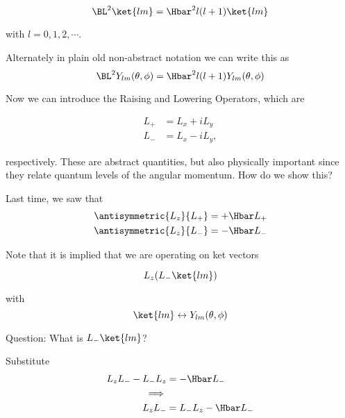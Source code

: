 \begin{equation}\label{eqn:PHY356Foct19:1008}
\BL^2 \ket{lm} = \Hbar^2 l (l + 1)\ket{l m}
\end{equation}

with \(l = 0, 1, 2, \cdots\).

Alternately in plain old non-abstract notation we can write this as
\begin{equation}\label{eqn:PHY356Foct19:1009}
\BL^2 Y_{lm}(\theta, \phi) = \Hbar^2 l (l + 1) Y_{lm}(\theta, \phi)
\end{equation}

Now we can introduce the Raising and Lowering Operators, which are

\begin{equation}\label{eqn:PHY356Foct19:1010}
\begin{aligned}
L_{+} &= L_x + i L_y \\
L_{-} &= L_x - i L_y,
\end{aligned}
\end{equation}

respectively.  These are abstract quantities, but also physically important since they relate quantum levels of the angular momentum.  How do we show this?

Last time, we saw that
\begin{equation}\label{eqn:PHY356Foct19:1011}
\begin{aligned}
\antisymmetric{L_z}{L_{+}} &= +\Hbar L_{+} \\
\antisymmetric{L_z}{L_{-}} &= -\Hbar L_{-}
\end{aligned}
\end{equation}

Note that it is implied that we are operating on ket vectors

\begin{equation}\label{eqn:lecture6OrbitalandIntrinsicMomentum:2100}
L_z (L_{-} \ket{lm} )
\end{equation}

with
\begin{equation}\label{eqn:PHY356Foct19:1012}
\ket{lm} \leftrightarrow Y_{lm}(\theta, \phi)
\end{equation}

Question: What is \(L_{-} \ket{lm}\)?

Substitute
\begin{equation}\label{eqn:lecture6OrbitalandIntrinsicMomentum:2120}
\begin{aligned}
L_z L_{-} - L_{-} L_z &= - \Hbar L_{-} \\
\implies \\
L_z L_{-} &= L_{-} L_z - \Hbar L_{-}
\end{aligned}
\end{equation}

